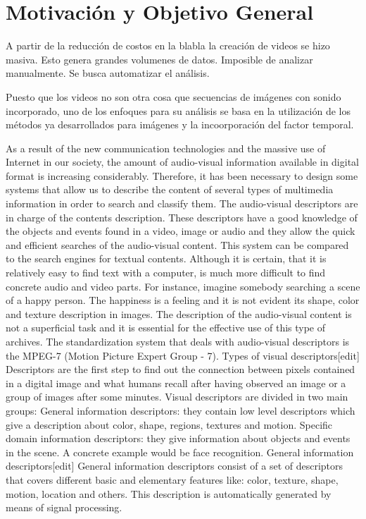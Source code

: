 \section{Motivación y Objetivo General}
\iffalse
Explique el problema o situación de referencia en el que se desarrolla la
propuesta o los interrogantes en el campo disciplinario a los que la propuesta se
dirige. Desarrolle la importancia e impacto de los objetivos y el conocimiento
que se generará. En esta sección no es necesario describir las tareas específicas
que se realizarán (para eso, ver Objetivos específicos).
\fi

A partir de la reducción de costos en la blabla la creación de videos se hizo masiva. Esto genera grandes volumenes de datos.
Imposible de analizar manualmente. Se busca automatizar el análisis.

Puesto que los videos no son otra cosa que secuencias de imágenes con sonido incorporado, uno de los enfoques para su análisis
se basa en la utilización de los métodos ya desarrollados para imágenes y la incoorporación del factor temporal. 



As a result of the new communication technologies and the massive use of Internet in our society, the amount of audio-visual information available in digital format is increasing considerably. Therefore, it has been necessary to design some systems that allow us to describe the content of several types of multimedia information in order to search and classify them.
The audio-visual descriptors are in charge of the contents description. These descriptors have a good knowledge of the objects and events found in a video, image or audio and they allow the quick and efficient searches of the audio-visual content.
This system can be compared to the search engines for textual contents. Although it is certain, that it is relatively easy to find text with a computer, is much more difficult to find concrete audio and video parts. For instance, imagine somebody searching a scene of a happy person. The happiness is a feeling and it is not evident its shape, color and texture description in images.
The description of the audio-visual content is not a superficial task and it is essential for the effective use of this type of archives. The standardization system that deals with audio-visual descriptors is the MPEG-7 (Motion Picture Expert Group - 7).
Types of visual descriptors[edit]
Descriptors are the first step to find out the connection between pixels contained in a digital image and what humans recall after having observed an image or a group of images after some minutes.
Visual descriptors are divided in two main groups:
General information descriptors: they contain low level descriptors which give a description about color, shape, regions, textures and motion.
Specific domain information descriptors: they give information about objects and events in the scene. A concrete example would be face recognition.
General information descriptors[edit]
General information descriptors consist of a set of descriptors that covers different basic and elementary features like: color, texture, shape, motion, location and others. This description is automatically generated by means of signal processing.

